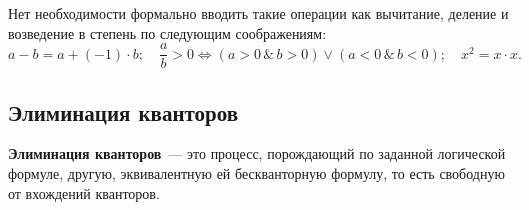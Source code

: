 \begin{remark}
    Нет необходимости формально вводить такие операции как вычитание, деление и возведение в степень по следующим соображениям:
    \begin{equation*}
        a-b=a+(-1)\cdot b; \quad \frac{a}{b} > 0 \Leftrightarrow (a > 0 \, \& \, b > 0) \lor (a < 0 \, \& \, b < 0); \quad x^2 = x \cdot x.
    \end{equation*}
\end{remark}

\subsection{Элиминация кванторов}

\begin{definition}
    \textbf{Элиминация кванторов}~--- это процесс, порождающий по заданной логической формуле, другую, эквивалентную ей бескванторную формулу, то есть свободную от вхождений кванторов.
\end{definition}

